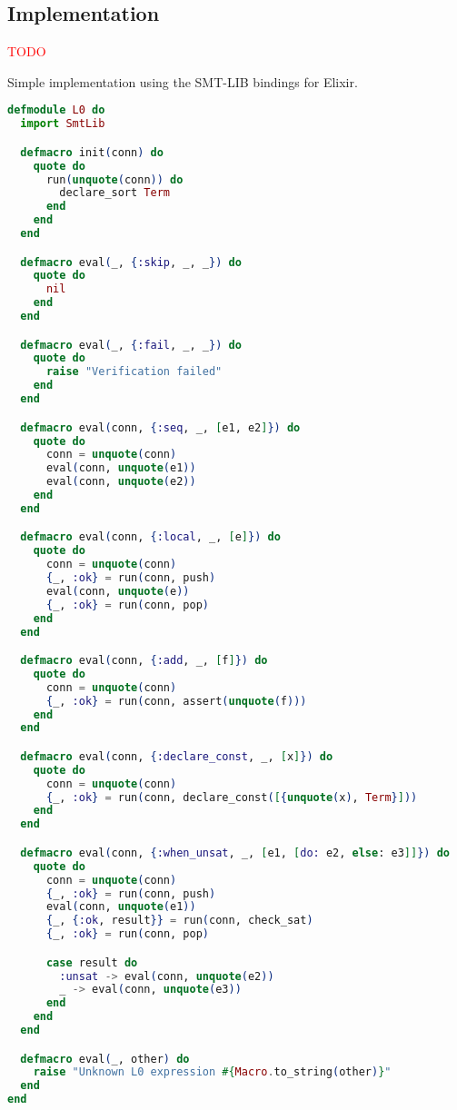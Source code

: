 \subsection{Implementation}

\textcolor{red}{TODO}

Simple implementation using the SMT-LIB bindings for Elixir.

\begin{lstlisting}[language=elixir,numbers=none,frame=none]
defmodule L0 do
  import SmtLib

  defmacro init(conn) do
    quote do
      run(unquote(conn)) do
        declare_sort Term
      end
    end
  end

  defmacro eval(_, {:skip, _, _}) do
    quote do
      nil
    end
  end

  defmacro eval(_, {:fail, _, _}) do
    quote do
      raise "Verification failed"
    end
  end

  defmacro eval(conn, {:seq, _, [e1, e2]}) do
    quote do
      conn = unquote(conn)
      eval(conn, unquote(e1))
      eval(conn, unquote(e2))
    end
  end

  defmacro eval(conn, {:local, _, [e]}) do
    quote do
      conn = unquote(conn)
      {_, :ok} = run(conn, push)
      eval(conn, unquote(e))
      {_, :ok} = run(conn, pop)
    end
  end

  defmacro eval(conn, {:add, _, [f]}) do
    quote do
      conn = unquote(conn)
      {_, :ok} = run(conn, assert(unquote(f)))
    end
  end

  defmacro eval(conn, {:declare_const, _, [x]}) do
    quote do
      conn = unquote(conn)
      {_, :ok} = run(conn, declare_const([{unquote(x), Term}]))
    end
  end

  defmacro eval(conn, {:when_unsat, _, [e1, [do: e2, else: e3]]}) do
    quote do
      conn = unquote(conn)
      {_, :ok} = run(conn, push)
      eval(conn, unquote(e1))
      {_, {:ok, result}} = run(conn, check_sat)
      {_, :ok} = run(conn, pop)

      case result do
        :unsat -> eval(conn, unquote(e2))
        _ -> eval(conn, unquote(e3))
      end
    end
  end

  defmacro eval(_, other) do
    raise "Unknown L0 expression #{Macro.to_string(other)}"
  end
end
\end{lstlisting}
